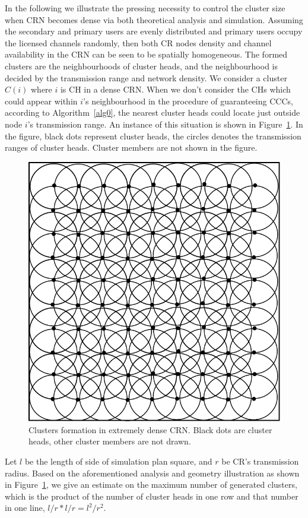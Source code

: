 \documentclass[10pt,journal,compsoc]{IEEEtran}
\theoremstyle{mytheoremstyle}
\theoremstyle{mytheoremstyle}
\theoremstyle{mytheoremstyle}
\begin{document}
In the following we illustrate the pressing necessity to control the cluster size when CRN becomes dense via both theoretical analysis and simulation.
Assuming the secondary and primary users are evenly distributed and primary users occupy the licensed channels randomly, then both CR nodes density and channel availability in the CRN can be seen to be spatially homogeneous.
The formed clusters are the neighbourhoods of cluster heads, and the neighbourhood is decided by the transmission range and network density.
%
We consider a cluster $C(i)$ where $i$ is CH in a dense CRN. 
When we don't consider the CHs which could appear within $i$'s neighbourhood in the procedure of guaranteeing CCCs, according to Algorithm~\ref{alg0}, the nearest cluster heads could locate just outside node $i$'s transmission range.
An instance of this situation is shown in Figure~\ref{clusters_denseNetwork}.
%
In the figure, black dots represent cluster heads, the circles denotes the transmission ranges of cluster heads.
Cluster members are not shown in the figure.
\begin{figure}[h!]
  \centering
  \includegraphics[width=0.4\linewidth]{clusters_denseNetwork_2.pdf}
  \caption{Clusters formation in extremely dense CRN. Black dots are cluster heads, other cluster members are not drawn.}
  \label{clusters_denseNetwork}
\end{figure}
Let $l$ be the length of side of simulation plan square, and $r$ be CR's transmission radius.
Based on the aforementioned analysis and geometry illustration as shown in Figure~\ref{clusters_denseNetwork}, we give an estimate on the maximum number of generated clusters, which is the product of the number of cluster heads in one row and that number in one line, $l/r * l/r = l^2/r^2$.
\end{document}
